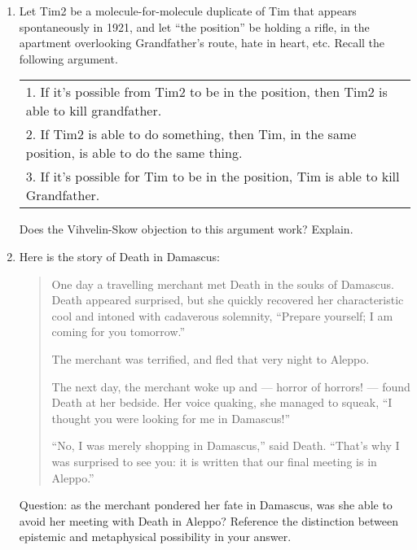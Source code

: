 \documentclass[12pt,a4paper]{article}
\begin{document}
\begin{enumerate}
\item Let Tim2 be a molecule-for-molecule duplicate of Tim that appears spontaneously in 1921, and let ``the position'' be holding a rifle, in the apartment overlooking Grandfather's route, hate in heart, etc. Recall the following argument. 
\begin{center}
\begin{tabular}{l}
1. If it's possible from Tim2 to be in the position, then Tim2 is able to kill grandfather.\\
2. If Tim2 is able to do something, then Tim, in the same position, is able to do the same thing.\\ \hline
3. If it's possible for Tim to be in the position, Tim is able to kill Grandfather.
\end{tabular}
\end{center}

Does the Vihvelin-Skow objection to this argument work? Explain.

\item Here is the story of Death in Damascus:

\begin{quote}
One day a travelling merchant met Death in the souks of Damascus. Death appeared surprised, but she quickly recovered her characteristic cool and intoned with cadaverous solemnity, ``Prepare yourself; I am coming for you tomorrow.'' \vspace{.05in}

The merchant was terrified, and fled that very night to Aleppo. \vspace{.05in}

The next day, the merchant woke up and --- horror of horrors! --- found Death at her bedside. Her voice quaking, she managed to squeak, ``I thought you were looking for me in Damascus!'' \vspace{.05in}

``No, I was merely shopping in Damascus,'' said Death. ``That's why I was surprised to see you: it is written that our final meeting is in Aleppo.'' 
\end{quote}

Question: as the merchant pondered her fate in Damascus, was she able to avoid her meeting with Death in Aleppo? Reference the distinction between epistemic and metaphysical possibility in your answer.


\end{enumerate}
\end{document}
